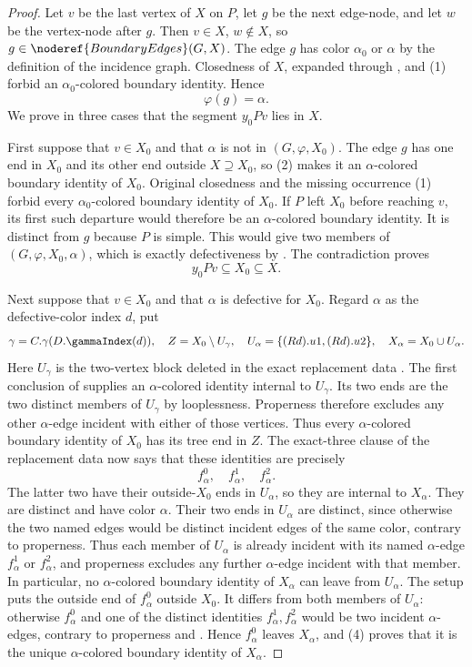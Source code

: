\begin{proof}
Let $v$ be the last vertex of $X$ on $P$, let $g$ be the next edge-node,
and let $w$ be the vertex-node after $g$.  Then $v\in X$, $w\notin X$,
so $g\in\noderef{BoundaryEdges}(G,X)$.  The edge $g$ has color
$\alpha_0$ or $\alpha$ by the definition of the incidence graph.
Closedness of $X$, expanded through
, and (1) forbid an
$\alpha_0$-colored boundary identity.  Hence
\[
 \varphi(g)=\alpha.                                         \tag{2}
\]
We prove in three cases that the segment $y_0Pv$ lies in $X$.

First suppose that $v\in X_0$ and that $\alpha$ is not in
$(G,\varphi,X_0)$.  The edge $g$ has one end in
$X_0$ and its other end outside $X\supseteq X_0$, so (2) makes it an
$\alpha$-colored boundary identity of $X_0$.  Original closedness and
the missing occurrence (1) forbid every $\alpha_0$-colored boundary
identity of $X_0$.  If $P$ left $X_0$ before reaching $v$, its first such
departure would therefore be an $\alpha$-colored boundary identity.
It is distinct from $g$ because $P$ is simple.  This would give two
members of $(G,\varphi,X_0,\alpha)$, which
is exactly defectiveness by .  The contradiction
proves
\[
 y_0Pv\subseteq X_0\subseteq X.                              \tag{3}
\]

Next suppose that $v\in X_0$ and that $\alpha$ is defective for $X_0$.
Regard $\alpha$ as the defective-color index $d$, put
\[
 \gamma= C.\gamma(D.\gammaIndex(d)),\quad
 Z=X_0\setminus U_\gamma,\quad
 U_\alpha=\{(R d).u1,(R d).u2\},\quad X_\alpha=X_0\cup U_\alpha.
\]
Here $U_\gamma$ is the two-vertex block deleted in the exact replacement
data .  The first conclusion of
 supplies an
$\alpha$-colored identity internal to $U_\gamma$.  Its two ends are the
two distinct members of $U_\gamma$ by looplessness.  Properness therefore
excludes any other $\alpha$-edge incident with either of those vertices.
Thus every $\alpha$-colored boundary identity of $X_0$ has its tree end
in $Z$.  The exact-three clause of the replacement data now says that
these identities are precisely
\[
 f^0_\alpha,\quad f^1_\alpha,\quad f^2_\alpha.               \tag{4}
\]
The latter two have their outside-$X_0$ ends in $U_\alpha$, so they are
internal to $X_\alpha$.  They are distinct and have color $\alpha$.
Their two ends in $U_\alpha$ are distinct, since otherwise the two named
edges would be distinct incident edges of the same color, contrary to
properness.  Thus each member of $U_\alpha$ is already incident with its
named $\alpha$-edge $f^1_\alpha$ or $f^2_\alpha$, and properness excludes
any further $\alpha$-edge incident with that member.  In particular, no
$\alpha$-colored boundary identity of $X_\alpha$ can leave from
$U_\alpha$.  The setup puts the outside end of
$f^0_\alpha$ outside $X_0$.  It differs from both members of $U_\alpha$:
otherwise $f^0_\alpha$ and one of the distinct identities
$f^1_\alpha,f^2_\alpha$ would be two incident $\alpha$-edges, contrary
to properness and .  Hence $f^0_\alpha$ leaves
$X_\alpha$, and (4) proves that it is the unique $\alpha$-colored
boundary identity of $X_\alpha$.


\end{proof}
